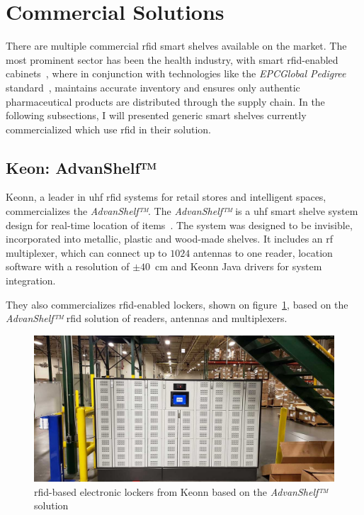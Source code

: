 \section{Commercial Solutions}

There are multiple commercial \ac{rfid} smart shelves available on the market.
The most prominent sector has been the health industry, with smart \ac{rfid}-enabled cabinets~\cite{RFIDSmartCabinets, RFIDTechnologyCabinet, DyaneSmartCabinetSmart,RFIDEnabledCabinetry}, where in conjunction with technologies like the \emph{EPCGlobal Pedigree} standard~\cite{PedigreeStandardV1}, maintains accurate inventory and ensures only authentic pharmaceutical products are distributed through the supply chain.
In the following subsections, I will presented generic smart shelves currently commercialized which use \ac{rfid} in their solution.

\subsection{Keon: AdvanShelf™}

Keonn, a leader in \ac{uhf} \ac{rfid} systems for retail stores and intelligent spaces, commercializes the \emph{AdvanShelf™}.
The \emph{AdvanShelf™} is a \ac{uhf} smart shelve system design for real-time location of items~\cite{AdvanShelfRFIDSmart}.
The system was designed to be invisible, incorporated into metallic, plastic and wood-made shelves.
It includes an \ac{rf} multiplexer, which can connect up to $1024$ antennas to one reader, location software with a resolution of $\pm40$~cm and Keonn Java drivers for system integration.

They also commercializes \ac{rfid}-enabled lockers, shown on figure~\ref{fig:keonnlocker}, based on the \emph{AdvanShelf™} \ac{rfid} solution of readers, antennas and multiplexers.

\begin{figure}[!ht]
    \centering
    \includegraphics[width=1\textwidth]{./figs/02-state-of-the-art/keonn_lockers.jpg}
    \caption[\ac{rfid}-based electronic lockers from Keonn]{\ac{rfid}-based electronic lockers from Keonn based on the \emph{AdvanShelf™} solution~\cite{RFIDenabledLockersProvide}} 
    \label{fig:keonnlocker}
\end{figure}

